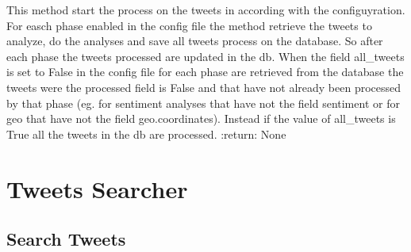 \documentclass[letterpaper,10pt,english]{sphinxmanual}
\begin{document}
\begin{fulllineitems}
\begin{fulllineitems}
\label{\detokenize{code_comment/tweet_processor:hate_tweet_map.tweets_processor.TweetProcessor.ProcessTweet.start}}
\sphinxAtStartPar
This method start the process on the tweets in according with the configuyration.
For easch phase enabled in the config file the method retrieve the tweets to analyze,
do the analyses and save all tweets process on the database.
So after each phase the tweets processed are updated in the db.
When the field all\_tweets is set to False in the config file for each phase are retrieved from the database
the tweets were the processed field is False and that have not already been processed by that phase
(eg. for sentiment analyses that have not the field sentiment  or for geo that have not the field geo.coordinates).
Instead if the value of all\_tweets is True all the tweets in the db are processed.
:return: None

\end{fulllineitems}


\end{fulllineitems}



\section{Tweets Searcher}
\label{\detokenize{code_comment/tweet_search:tweets-searcher}}\label{\detokenize{code_comment/tweet_search::doc}}

\subsection{Search Tweets}
\label{\detokenize{code_comment/tweet_search:module-hate_tweet_map.tweets_searcher.SearchTweets}}\label{\detokenize{code_comment/tweet_search:search-tweets}}
\end{document}
